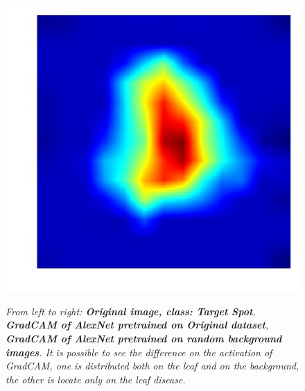 \begin{figure}
\begin{center}
{			\includegraphics[scale=0.24]{./images/Target_Spot2normal_cam}
		}
	\end{center}
				\caption{\textit{From left to right: \textbf{Original image, class: Target Spot}, \textbf{GradCAM of AlexNet pretrained on Original dataset}, \textbf{GradCAM of AlexNet pretrained on random background images}. It is possible to see the difference on the activation of GradCAM, one is distributed both on the leaf and on the background, the other is locate only on the leaf disease.}}
	\label{fig:gradcam}
	\label{fig:long}
	\label{fig:onecol}
	\vspace{-10pt}
\end{figure}
